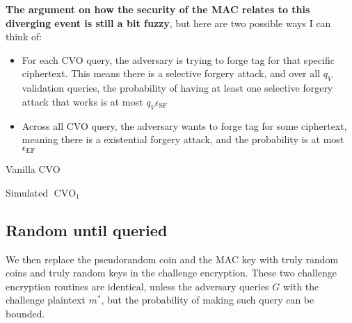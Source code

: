 \documentclass{article}
\begin{document}
\textbf{The argument on how the security of the MAC relates to this diverging event is still a bit fuzzy}, but here are two possible ways I can think of:

\begin{itemize}
    \item For each CVO query, the adversary is trying to forge tag for that specific ciphertext. This means there is a selective forgery attack, and over all $q_V$ validation queries, the probability of having at least one selective forgery attack that works is at most $q_V\epsilon_\text{SF}$
    
    \item Across all CVO query, the adversary wants to forge tag for some ciphertext, meaning there is a existential forgery attack, and the probability is at most $\epsilon_\text{EF}$
\end{itemize}

\begin{multicols}{2}
    \begin{algorithm}[H]
        \SetAlgoLined
        \caption{Vanilla CVO}
    \end{algorithm}

    \columnbreak

    \begin{algorithm}[H]
        \SetAlgoLined
        \caption{Simulated $\operatorname{CVO}_1$}
        \Return{$\bot$}
    \end{algorithm}
\end{multicols}

\subsection{Random until queried}\label{random-until-queried}
We then replace the pseudorandom coin and the MAC key with truly random coins and truly random keys in the challenge encryption. These two challenge encryption routines are identical, unless the adversary queries $G$ with the challenge plaintext $m^\ast$, but the probability of making such query can be bounded.
\end{document}
